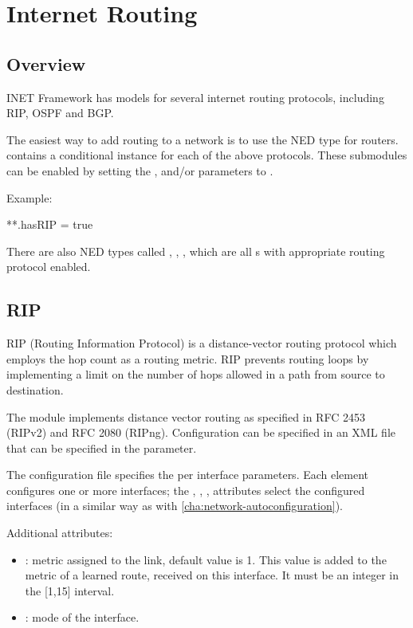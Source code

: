 \chapter{Internet Routing}
\label{cha:routing}

\section{Overview}

INET Framework has models for several internet routing protocols, including
RIP, OSPF and BGP.

The easiest way to add routing to a network is to use the 
NED type for routers.  contains a conditional instance
for each of the above protocols. These submodules can be enabled by
setting the ,  and/or  parameters to
.

Example:

\begin{inifile}
**.hasRIP = true
\end{inifile}

There are also NED types called , ,
, which are all s with appropriate
routing protocol enabled.

\section{RIP}
\label{sec:rip}

RIP (Routing Information Protocol) is a distance-vector routing protocol
which employs the hop count as a routing metric. RIP prevents routing loops
by implementing a limit on the number of hops allowed in a path from source
to destination.

The  module implements distance vector routing as
specified in RFC 2453 (RIPv2) and RFC 2080 (RIPng). Configuration
can be specified in an XML file that can be specified in the
 parameter.

The configuration file specifies the per interface parameters.
Each  element configures one or more interfaces;
the , , ,  attributes
select the configured interfaces (in a similar way as with
 \ref{cha:network-autoconfiguration}).

Additional attributes:
\begin{itemize}
  \item {}: metric assigned to the link, default value is 1.
        This value is added to the metric of a learned route,
        received on this interface. It must be an integer in
        the [1,15] interval.
  \item {}: mode of the interface.
\end{itemize}

